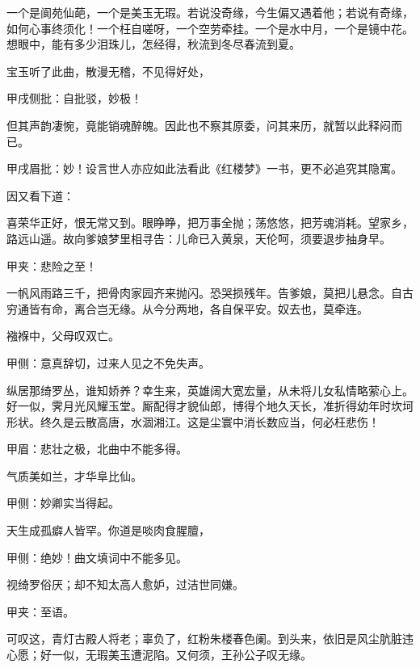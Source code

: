 \begin{qute}
    一个是阆苑仙葩，一个是美玉无瑕。若说没奇缘，今生偏又遇着他；若说有奇缘，如何心事终须化！一个枉自嗟呀，一个空劳牵挂。一个是水中月，一个是镜中花。想眼中，能有多少泪珠儿，怎经得，秋流到冬尽春流到夏。
\end{qute}
\begin{parag}
    宝玉听了此曲，散漫无稽，不见得好处，\begin{note}甲戌侧批：自批驳，妙极！\end{note}但其声韵凄惋，竟能销魂醉魄。因此也不察其原委，问其来历，就暂以此释闷而已。\begin{note}甲戌眉批：妙！设言世人亦应如此法看此《红楼梦》一书，更不必追究其隐寓。\end{note}因又看下道：
\end{parag}
\begin{qute}
    喜荣华正好，恨无常又到。眼睁睁，把万事全抛；荡悠悠，把芳魂消耗。望家乡，路远山遥。故向爹娘梦里相寻告：儿命已入黄泉，天伦呵，须要退步抽身早。\begin{note}甲夹：悲险之至！\end{note}
\end{qute}
\begin{qute}
    一帆风雨路三千，把骨肉家园齐来抛闪。恐哭损残年。告爹娘，莫把儿悬念。自古穷通皆有命，离合岂无缘。从今分两地，各自保平安。奴去也，莫牵连。
\end{qute}
\begin{qute}
    襁褓中，父母叹双亡。\begin{note}甲侧：意真辞切，过来人见之不免失声。\end{note}纵居那绮罗丛，谁知娇养？幸生来，英雄阔大宽宏量，从未将儿女私情略萦心上。好一似，霁月光风耀玉堂。厮配得才貌仙郎，博得个地久天长，准折得幼年时坎坷形状。终久是云散高唐，水涸湘江。这是尘寰中消长数应当，何必枉悲伤！\begin{note}甲眉：悲壮之极，北曲中不能多得。\end{note}
\end{qute}
\begin{qute}
    气质美如兰，才华阜比仙。\begin{note}甲侧：妙卿实当得起。\end{note}天生成孤癖人皆罕。你道是啖肉食腥膻，\begin{note}甲侧：绝妙！曲文填词中不能多见。\end{note}视绮罗俗厌；却不知太高人愈妒，过洁世同嫌。\begin{note}甲夹：至语。\end{note}可叹这，青灯古殿人将老；辜负了，红粉朱楼春色阑。到头来，依旧是风尘肮脏违心愿；好一似，无瑕美玉遭泥陷。又何须，王孙公子叹无缘。
\end{qute}
